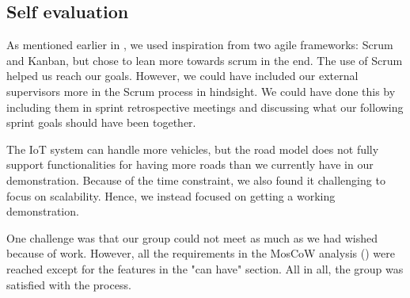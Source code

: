 \subsection{Self evaluation}
As mentioned earlier in , we used inspiration from two agile frameworks: Scrum and Kanban, but chose to lean more towards scrum in the end. The use of Scrum helped us reach our goals. However, we could have included our external supervisors more in the Scrum process in hindsight. We could have done this by including them in sprint retrospective meetings and discussing what our following sprint goals should have been together.

The IoT system can handle more vehicles, but the road model does not fully support functionalities for having more roads than we currently have in our demonstration. Because of the time constraint, we also found it challenging to focus on scalability. Hence, we instead focused on getting a working demonstration.  

One challenge was that our group could not meet as much as we had wished because of work. However, all the requirements in the MosCoW analysis () were reached except for the features in the "can have" section. All in all, the group was satisfied with the process.

